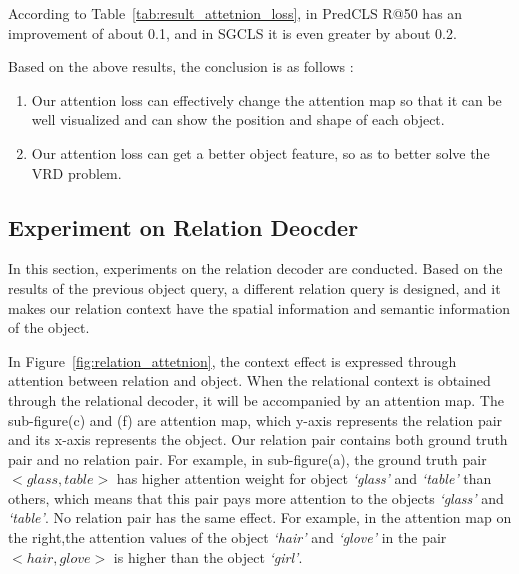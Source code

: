 According to Table~\ref{tab:result_attetnion_loss}, in PredCLS R@50 has an improvement of about 0.1, and in SGCLS it is even greater by about 0.2.

Based on the above results, the conclusion is as follows  :
\begin{enumerate}
	\item Our attention loss can effectively change the attention map so that it can be well visualized and can show the position and shape of each object.
	\item Our attention loss can get a better object feature, so as to better solve the VRD problem.
\end{enumerate}

\subsection{Experiment on Relation Deocder}
In this section,  experiments on the relation decoder are conducted. Based on the results of the previous object query, a different relation query is designed, and it makes our relation context have the spatial information and semantic information of the object.


In Figure~\ref{fig:relation_attetnion}, the context effect is expressed through attention between relation and object. When the relational context is obtained through the relational decoder, it will be accompanied by an attention map. The sub-figure(c) and (f) are attention map, which y-axis represents the relation pair and its x-axis represents the object. Our relation pair contains both ground truth pair and no relation pair. For example, in sub-figure(a), the ground truth pair $<glass, table> $ has higher attention weight for object \textit{`glass'} and \textit{`table'} than others, which means that this pair pays more attention to the objects \textit{`glass'} and \textit{`table'}. No relation pair has the same effect. For example, in the attention map on the right,the attention values of the object \textit{ `hair'} and \textit{`glove'} in the pair $<hair, glove> $   is higher than the object \textit{`girl'}.



